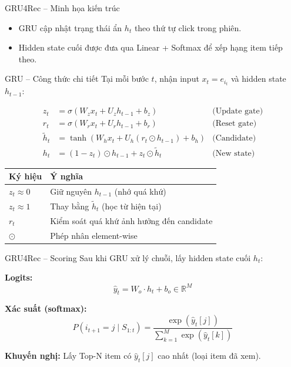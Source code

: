 \documentclass[aspectratio=169, 11pt]{beamer}
\begin{document}
\begin{frame}{GRU4Rec -- Minh họa kiến trúc}

\vspace{0.15cm}
\footnotesize
\begin{itemize}
    \item GRU cập nhật trạng thái ẩn $h_t$ theo thứ tự click trong phiên.
    \item Hidden state cuối được đưa qua Linear + Softmax để xếp hạng item tiếp theo.
\end{itemize}
\end{frame}

\begin{frame}{GRU -- Công thức chi tiết}
Tại mỗi bước $t$, nhận input $x_t = e_{i_t}$ và hidden state $h_{t-1}$:

\begin{align}
z_t &= \sigma(W_z x_t + U_z h_{t-1} + b_z) & \text{(Update gate)} \\
r_t &= \sigma(W_r x_t + U_r h_{t-1} + b_r) & \text{(Reset gate)} \\
\tilde{h}_t &= \tanh(W_h x_t + U_h (r_t \odot h_{t-1}) + b_h) & \text{(Candidate)} \\
h_t &= (1 - z_t) \odot h_{t-1} + z_t \odot \tilde{h}_t & \text{(New state)}
\end{align}

\vspace{0.3cm}
\begin{table}
\centering
\small
\begin{tabular}{ll}
\toprule
\textbf{Ký hiệu} & \textbf{Ý nghĩa} \\
\midrule
$z_t \approx 0$ & Giữ nguyên $h_{t-1}$ (nhớ quá khứ) \\
$z_t \approx 1$ & Thay bằng $\tilde{h}_t$ (học từ hiện tại) \\
$r_t$ & Kiểm soát quá khứ ảnh hưởng đến candidate \\
$\odot$ & Phép nhân element-wise \\
\bottomrule
\end{tabular}
\end{table}
\end{frame}

\begin{frame}{GRU4Rec -- Scoring}
Sau khi GRU xử lý chuỗi, lấy hidden state cuối $h_t$:

\vspace{0.3cm}
\textbf{Logits:}
\begin{equation}
\hat{y}_t = W_o \cdot h_t + b_o \in \mathbb{R}^M
\end{equation}

\textbf{Xác suất (softmax):}
\begin{equation}
P(i_{t+1} = j \;|\; S_{1:t}) = \frac{\exp(\hat{y}_t[j])}{\sum_{k=1}^{M} \exp(\hat{y}_t[k])}
\end{equation}

\textbf{Khuyến nghị:} Lấy Top-N item có $\hat{y}_t[j]$ cao nhất (loại item đã xem).
\end{frame}
\end{document}

